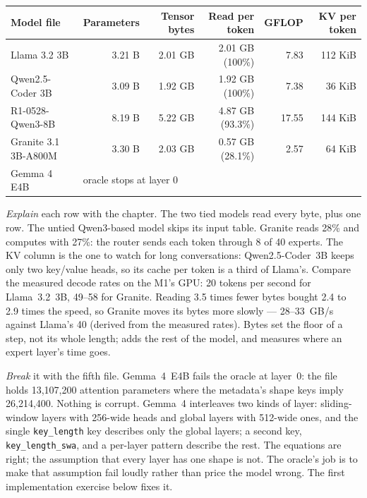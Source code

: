\begin{center}\small
\setlength{\tabcolsep}{4.5pt}
\begin{tabular}{@{}lrrrrr@{}}
\toprule
Model file & Parameters & Tensor bytes & Read per token & GFLOP & KV per token \\
\midrule
Llama 3.2 3B & 3.21 B & 2.01 GB & 2.01 GB (100\%) & 7.83 & 112 KiB \\
Qwen2.5-Coder 3B & 3.09 B & 1.92 GB & 1.92 GB (100\%) & 7.38 & 36 KiB \\
R1-0528-Qwen3-8B & 8.19 B & 5.22 GB & 4.87 GB (93.3\%) & 17.55 & 144 KiB \\
Granite 3.1 3B-A800M & 3.30 B & 2.03 GB & 0.57 GB (28.1\%) & 2.57 & 64 KiB \\
Gemma 4 E4B & \multicolumn{5}{l}{oracle stops at layer 0} \\
\bottomrule
\end{tabular}
\end{center}

\noindent \emph{Explain} each row with the chapter. The two tied models read
every byte, plus one row. The untied Qwen3-based model skips its input table.
Granite reads 28\% and computes with 27\%: the router sends each token through
8 of 40 experts. The KV column is the one to watch for long conversations:
Qwen2.5-Coder~3B keeps only two key/value heads, so its cache per token is a
third of Llama's. Compare the measured decode rates on the M1's GPU: 20 tokens
per second for Llama~3.2~3B, 49--58 for Granite. Reading 3.5 times fewer bytes
bought 2.4 to 2.9 times the speed, so Granite moves its bytes more slowly ---
28--33~GB/s against Llama's 40 (derived from the measured rates). Bytes set the
floor of a step, not its whole length;  adds the rest of the
model, and  measures where an expert layer's time
goes.

\emph{Break} it with the fifth file. Gemma~4~E4B fails the oracle at layer~0:
the file holds 13,107,200 attention parameters where the metadata's shape keys
imply 26,214,400. Nothing is corrupt. Gemma~4 interleaves two kinds of layer:
sliding-window layers with 256-wide heads and global layers with 512-wide ones,
and the single \texttt{key\_length} key describes only the global layers; a
second key, \texttt{key\_length\_swa}, and a per-layer pattern describe the
rest. The equations are right; the assumption that every layer has one shape
is not. The oracle's job is to make that assumption fail loudly rather than
price the model wrong. The first implementation exercise below fixes it.

